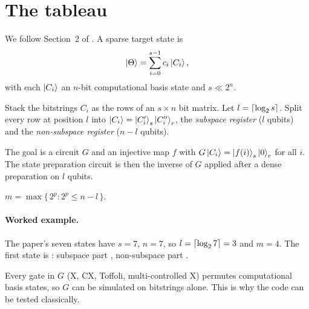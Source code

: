 \section{The tableau}

We follow Section~2 of \cite{rupprecht2026sparse}. A sparse target state is
\[
  \ket{\Theta} = \sum_{i=0}^{s-1} c_i \ket{C_i},
\]
with each $\ket{C_i}$ an $n$-bit computational basis state and $s \ll 2^n$.

\begin{definition}[Tableau]
Stack the bitstrings $C_i$ as the rows of an $s \times n$ bit matrix.
Let $l = \left\lceil \log_2 s \right\rceil$. Split every row at position $l$ into
$\ket{C_i} = \ket{C'_i}_{s}\ket{C''_i}_{r}$, the \emph{subspace register}
($l$ qubits) and the \emph{non-subspace register} ($n-l$ qubits).
\end{definition}

The goal is a circuit $G$ and an injective map $f$ with
$G\ket{C_i} = \ket{f(i)}_s \ket{0}_r$ for all $i$. The state preparation
circuit is then the inverse of $G$ applied after a dense preparation on
$l$ qubits.

\begin{definition}
$m = \max\{\,2^p : 2^p \le n - l\,\}$.
\end{definition}

\paragraph{Worked example.} The paper's seven states have $s=7$, $n=7$,
so $l=\left\lceil \log_2 7 \right\rceil=3$ and $m=4$. The first state is
: subspace part , non-subspace part .

\begin{remark}
Every gate in $G$ (X, CX, Toffoli, multi-controlled X) permutes
computational basis states, so $G$ can be simulated on bitstrings alone.
This is why the code can be tested classically.
\end{remark}